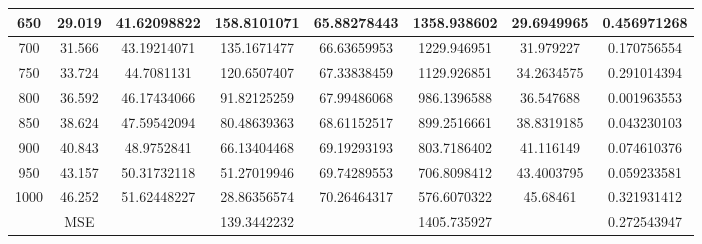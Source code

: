 \documentclass{article}
\begin{document}
\begin{flushleft}
\begin{adjustbox}{width=1.1\textwidth,center=\textwidth}
\begin{tabular}{|c|c|c|c|c|c|c|c|}
        \hline
        650	&29.019&	41.62098822&	158.8101071&	65.88278443&	1358.938602&	29.6949965&	0.456971268\\
        \hline
        700	&31.566	&43.19214071	&135.1671477	&66.63659953	&1229.946951	&31.979227	&0.170756554\\
        \hline
        750	&33.724&	44.7081131&	120.6507407&	67.33838459&	1129.926851&	34.2634575&	0.291014394\\
        \hline
        800	&36.592	&46.17434066	&91.82125259	&67.99486068&	986.1396588	&36.547688	&0.001963553\\
        \hline
        850	&38.624	&47.59542094&	80.48639363&	68.61152517&	899.2516661&	38.8319185&	0.043230103\\
        \hline
        900	&40.843	&48.9752841	&66.13404468&	69.19293193&	803.7186402&	41.116149&	0.074610376\\
        \hline
        950	&43.157&	50.31732118&	51.27019946&	69.74289553&	706.8098412&	43.4003795&	0.059233581\\
        \hline
        1000	&46.252	&51.62448227	&28.86356574	&70.26464317	&576.6070322	&45.68461	&0.321931412\\

        \hline
        {}&	{MSE}&{}&		139.3442232
&{}&		1405.735927
&{}&	0.272543947\\
        \hline
        \end{tabular}
        \end{adjustbox}
    \end{flushleft}
    
\end{document}
